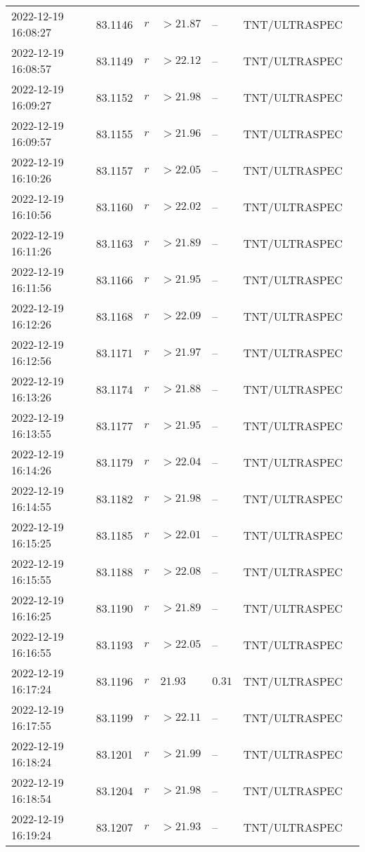 \documentclass{nature_plusfigure}
\begin{document}
\begin{supplement}
\begin{center}
\begin{longtable}{lllllll}
2022-12-19 16:08:27 & 83.1146 & $r$ & $>21.87$ & -- & TNT/ULTRASPEC &  \\ 
2022-12-19 16:08:57 & 83.1149 & $r$ & $>22.12$ & -- & TNT/ULTRASPEC &  \\ 
2022-12-19 16:09:27 & 83.1152 & $r$ & $>21.98$ & -- & TNT/ULTRASPEC &  \\ 
2022-12-19 16:09:57 & 83.1155 & $r$ & $>21.96$ & -- & TNT/ULTRASPEC &  \\ 
2022-12-19 16:10:26 & 83.1157 & $r$ & $>22.05$ & -- & TNT/ULTRASPEC &  \\ 
2022-12-19 16:10:56 & 83.1160 & $r$ & $>22.02$ & -- & TNT/ULTRASPEC &  \\ 
2022-12-19 16:11:26 & 83.1163 & $r$ & $>21.89$ & -- & TNT/ULTRASPEC &  \\ 
2022-12-19 16:11:56 & 83.1166 & $r$ & $>21.95$ & -- & TNT/ULTRASPEC &  \\ 
2022-12-19 16:12:26 & 83.1168 & $r$ & $>22.09$ & -- & TNT/ULTRASPEC &  \\ 
2022-12-19 16:12:56 & 83.1171 & $r$ & $>21.97$ & -- & TNT/ULTRASPEC &  \\ 
2022-12-19 16:13:26 & 83.1174 & $r$ & $>21.88$ & -- & TNT/ULTRASPEC &  \\ 
2022-12-19 16:13:55 & 83.1177 & $r$ & $>21.95$ & -- & TNT/ULTRASPEC &  \\ 
2022-12-19 16:14:26 & 83.1179 & $r$ & $>22.04$ & -- & TNT/ULTRASPEC &  \\ 
2022-12-19 16:14:55 & 83.1182 & $r$ & $>21.98$ & -- & TNT/ULTRASPEC &  \\ 
2022-12-19 16:15:25 & 83.1185 & $r$ & $>22.01$ & -- & TNT/ULTRASPEC &  \\ 
2022-12-19 16:15:55 & 83.1188 & $r$ & $>22.08$ & -- & TNT/ULTRASPEC &  \\ 
2022-12-19 16:16:25 & 83.1190 & $r$ & $>21.89$ & -- & TNT/ULTRASPEC &  \\ 
2022-12-19 16:16:55 & 83.1193 & $r$ & $>22.05$ & -- & TNT/ULTRASPEC &  \\ 
2022-12-19 16:17:24 & 83.1196 & $r$ & $21.93$ & $0.31$ & TNT/ULTRASPEC &  \\ 
2022-12-19 16:17:55 & 83.1199 & $r$ & $>22.11$ & -- & TNT/ULTRASPEC &  \\ 
2022-12-19 16:18:24 & 83.1201 & $r$ & $>21.99$ & -- & TNT/ULTRASPEC &  \\ 
2022-12-19 16:18:54 & 83.1204 & $r$ & $>21.98$ & -- & TNT/ULTRASPEC &  \\ 
2022-12-19 16:19:24 & 83.1207 & $r$ & $>21.93$ & -- & TNT/ULTRASPEC &  \\ 

\end{longtable}
\end{center}
\end{supplement}
\end{document}

